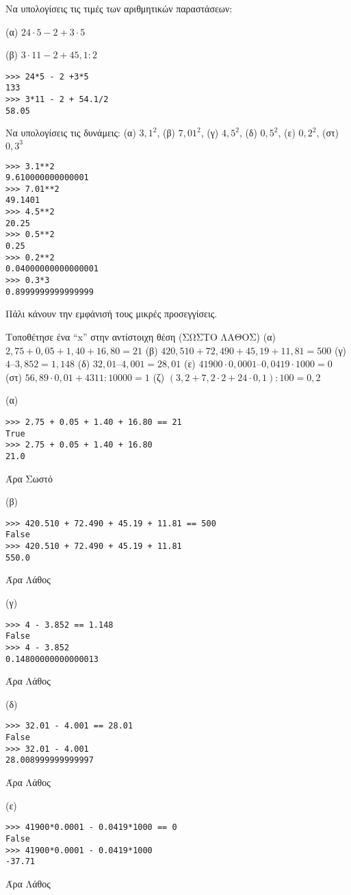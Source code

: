 \begin{exercise}
Να υπολογίσεις τις τιμές των αριθμητικών παραστάσεων:

(α) $24\cdot 5 - 2 + 3 \cdot 5$

(β) $3\cdot 11 -2 + 45,1 : 2$
\end{exercise}
\begin{lstlisting}
>>> 24*5 - 2 +3*5
133
>>> 3*11 - 2 + 54.1/2
58.05
\end{lstlisting}

\begin{exercise}
Να υπολογίσεις τις δυνάμεις:
(α) $3,1^2$, (β) $7,01^2$, (γ) $4,5^2$, (δ) $0,5^2$, (ε) $0,2^2$, (στ) $0,3^3$
\end{exercise}
\begin{lstlisting}
>>> 3.1**2
9.610000000000001
>>> 7.01**2
49.1401
>>> 4.5**2
20.25
>>> 0.5**2
0.25
>>> 0.2**2
0.04000000000000001
>>> 0.3*3
0.8999999999999999
\end{lstlisting}
Πάλι κάνουν την εμφάνισή τους μικρές προσεγγίσεις.

\begin{exercise}
Τοποθέτησε ένα ``x'' στην αντίστοιχη θέση (ΣΩΣΤΟ ΛΑΘΟΣ)
(α) $2,75 + 0,05 + 1,40 + 16,80 = 21$
(β) $420,510 + 72,490 + 45,19 + 11,81 = 500$
(γ) $4 – 3,852 = 1,148$
(δ) $32,01 – 4,001 = 28,01$
(ε) $41900 \cdot 0,0001 – 0,0419 \cdot 1000 = 0$
(στ) $56,89 \cdot 0,01 + 4311 : 10000 = 1$
(ζ) $(3,2 + 7,2 \cdot 2 + 24 \cdot 0,1) : 100 = 0,2$
\end{exercise}

(α)
\begin{lstlisting}
>>> 2.75 + 0.05 + 1.40 + 16.80 == 21
True
>>> 2.75 + 0.05 + 1.40 + 16.80
21.0
\end{lstlisting}
Άρα Σωστό

(β)
\begin{lstlisting}
>>> 420.510 + 72.490 + 45.19 + 11.81 == 500
False
>>> 420.510 + 72.490 + 45.19 + 11.81
550.0
\end{lstlisting}
Άρα Λάθος

(γ)
\begin{lstlisting}
>>> 4 - 3.852 == 1.148
False
>>> 4 - 3.852
0.14800000000000013
\end{lstlisting}
Άρα Λάθος

(δ)
\begin{lstlisting}
>>> 32.01 - 4.001 == 28.01
False
>>> 32.01 - 4.001
28.008999999999997
\end{lstlisting}
Άρα Λάθος

(ε)
\begin{lstlisting}
>>> 41900*0.0001 - 0.0419*1000 == 0
False
>>> 41900*0.0001 - 0.0419*1000
-37.71
\end{lstlisting}
Άρα Λάθος

